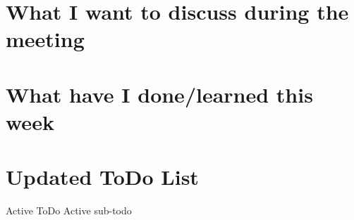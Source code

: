 \documentclass{article}
\begin{document}
	
\title{\jobname}
\author{Your Name goes here}
\maketitle

\section*{\color{cyan}What I want to discuss during the meeting}

\section*{\color{cyan}What have I done/learned this week}
	
\section*{\color{cyan}Updated ToDo List}
\newline
{} %
\begin{outline}
	\1 Active ToDo
		\2 Active sub-todo
	\1 
	\1 
\end{outline}
\end{document}
